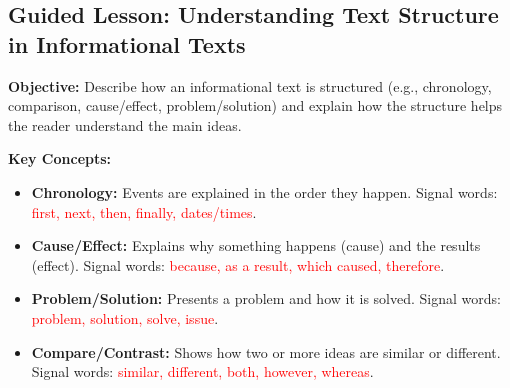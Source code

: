 \documentclass[12pt]{article}
\begin{document}
\subsection*{Guided Lesson: Understanding Text Structure in Informational Texts}
\onehalfspacing

\begin{tcolorbox}[colframe=black!40, colback=gray!5, 
coltitle=black, colbacktitle=black!20, fonttitle=\bfseries\Large, 
title=Learning Objective, halign title=center, left=5pt, right=5pt, top=5pt, bottom=15pt]
\textbf{Objective:} Describe how an informational text is structured (e.g., chronology, comparison, cause/effect, problem/solution) and explain how the structure helps the reader understand the main ideas.
\end{tcolorbox}

\vspace{1em}

\begin{tcolorbox}[colframe=black!60, colback=white, 
coltitle=black, colbacktitle=black!15, fonttitle=\bfseries\Large, 
title=Key Concepts and Vocabulary, halign title=center, left=10pt, right=10pt, top=10pt, bottom=15pt]
\textbf{Key Concepts:}
\begin{itemize}
    \item \textbf{Chronology:} Events are explained in the order they happen. Signal words: \textcolor{red}{first, next, then, finally, dates/times}.
    \item \textbf{Cause/Effect:} Explains why something happens (cause) and the results (effect). Signal words: \textcolor{red}{because, as a result, which caused, therefore}.
    \item \textbf{Problem/Solution:} Presents a problem and how it is solved. Signal words: \textcolor{red}{problem, solution, solve, issue}.
    \item \textbf{Compare/Contrast:} Shows how two or more ideas are similar or different. Signal words: \textcolor{red}{similar, different, both, however, whereas}.
\end{itemize}
\end{tcolorbox}

\vspace{1em}
\end{document}
